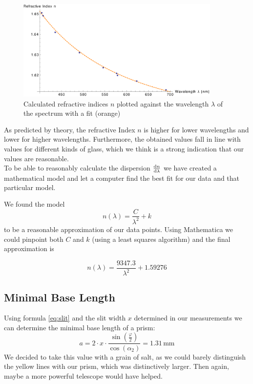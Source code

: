 \documentclass{scrreprt}
\newcommand{\unit}[1]{\ensuremath{\, \mathrm{#1}}}
\renewcommand{\phi}{\varphi}
\begin{document}
\begin{figure}[H]
	\centering
  \includegraphics[width=0.9\textwidth]{diag/meas_and_fit.pdf}
	\caption{Calculated refractive indices $n$ plotted against the wavelength $\lambda$ of the spectrum with a fit (orange)}
	\label{fig:meas_and_fit}
\end{figure}
As predicted by theory, the refractive Index $n$ is higher for lower wavelengths and lower for higher wavelengths. Furthermore, the obtained values fall in line with values for different kinds of glass, which we think is a strong indication that our values are reasonable.\\

To be able to reasonably calculate the dispersion $\frac{\dif n}{\dif \lambda}$ we have created a mathematical model and let a computer find the best fit for our data and that particular model.

We found the model 
\begin{equation}
n (\lambda) = \frac{C}{\lambda^2}+k
\end{equation}
to be a reasonable approximation of our data points. Using Mathematica we could pinpoint both $C$ and $k$ (using a least squares algorithm) and the final approximation is

\begin{equation}\label{eq:approx}
n (\lambda) = \frac{9347.3}{\lambda^2}+1.59276
\end{equation} 

\subsection{Minimal Base Length}
\label{sec:base_length}

Using formula \ref{eq:slit} and the slit width $x$ determined in our measurements we can determine the minimal base length of a prism:
\begin{equation}
	a = 2 \cdot x \cdot \frac{\sin(\frac{\phi}{2})}{\cos({\alpha_2})} = 1.31 \unit{mm}	
\end{equation}
We decided to take this value with a grain of salt, as we could barely distinguish the yellow lines with our prism, which was distinctively larger. Then again, maybe a more powerful telescope would have helped.
\end{document}
